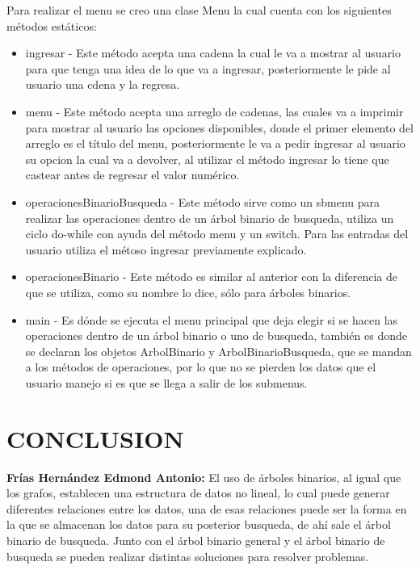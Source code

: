     Para realizar el menu se creo una clase Menu la cual cuenta con los siguientes métodos estáticos:
    \begin{itemize}
        \item  ingresar - Este método acepta una cadena la cual le va a mostrar al usuario para que tenga una idea de lo que va a ingresar, posteriormente le pide al usuario una cdena y la regresa.
        \item  menu - Este método acepta una arreglo de cadenas, las cuales va a imprimir para mostrar al usuario las opciones disponibles, donde el primer elemento del arreglo es el título del menu, posteriormente le va a pedir ingresar al usuario su opcion la cual va a devolver, al utilizar el método ingresar lo tiene que castear antes de regresar el valor numérico.
        \item operacionesBinarioBusqueda - Este método sirve como un sbmenu para realizar las operaciones dentro de un árbol binario de busqueda, utiliza un ciclo do-while con ayuda del método menu y un switch. Para las entradas del usuario utiliza el métoso ingresar previamente explicado.
        \item  operacionesBinario - Este método es similar al anterior con la diferencia de que se utiliza, como su nombre lo dice, sólo para árboles binarios. 
        \item main - Es dónde se ejecuta el menu principal que deja elegir si se hacen las operaciones dentro de un árbol binario o uno de busqueda, también es donde se declaran los objetos ArbolBinario y ArbolBinarioBusqueda, que se mandan a los métodos de operaciones, por lo que no se pierden los datos que el usuario manejo si es que se llega a salir de los submenus.
    \end{itemize}



\section*{CONCLUSION}

\textbf{Frías Hernández Edmond Antonio: } El uso de árboles binarios, al igual que los grafos, establecen una estructura de datos no lineal, lo cual puede generar diferentes relaciones entre los datos, una de esas relaciones puede ser la forma en la que se almacenan los datos para su posterior busqueda, de ahí sale el árbol binario de busqueda. Junto con el árbol binario general y el árbol binario de busqueda se pueden realizar distintas soluciones para resolver problemas.

